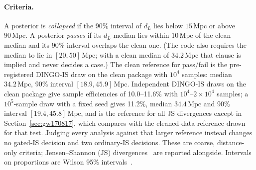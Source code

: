 \documentclass{openjournal}
\newcommand{\dL}{d_L}
\begin{document}
\paragraph{Criteria.}
A posterior is \emph{collapsed} if the 90\% interval of $\dL$ lies below $15\,\mathrm{Mpc}$ or above $90\,\mathrm{Mpc}$.
A posterior \emph{passes} if its $\dL$ median lies within $10\,\mathrm{Mpc}$ of the clean median and its 90\% interval overlaps the clean one. (The code also requires the median to lie in $[20,50]\,\mathrm{Mpc}$; with a clean median of $34.2\,\mathrm{Mpc}$ that clause is implied and never decides a case.)
The clean reference for pass/fail is the pre-registered DINGO-IS draw on the clean package with $10^{4}$ samples: median $34.2\,\mathrm{Mpc}$, 90\% interval $[18.9, 45.9]\,\mathrm{Mpc}$.
Independent DINGO-IS draws on the clean package give sample efficiencies of 10.0--11.6\% with $10^{4}$--$2\times10^{4}$ samples; a $10^{5}$-sample draw with a fixed seed gives 11.2\%, median $34.4\,\mathrm{Mpc}$ and 90\% interval $[19.4, 45.8]\,\mathrm{Mpc}$, and is the reference for all JS divergences except in Section~\ref{sec:gw170817}, which compares with the cleaned-data reference drawn for that test.
Judging every analysis against that larger reference instead changes no gated-IS decision and two ordinary-IS decisions.
These are coarse, distance-only criteria; Jensen--Shannon (JS) divergences~\cite{Lin1991jsd} are reported alongside.
Intervals on proportions are Wilson 95\% intervals~\cite{Wilson1927}.
\end{document}
